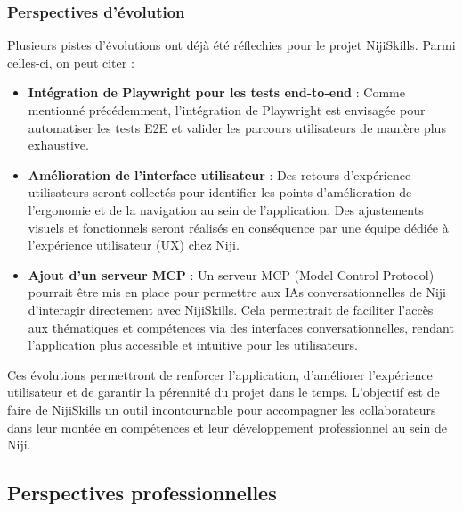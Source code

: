 \documentclass[12pt]{article}
\begin{document}
\subsubsection{Perspectives d’évolution}
Plusieurs pistes d'évolutions ont déjà été réflechies pour le projet NijiSkills. Parmi celles-ci, on peut citer :
\begin{itemize}
  \item \textbf{Intégration de Playwright pour les tests end-to-end} : Comme mentionné précédemment, l’intégration de Playwright est envisagée pour automatiser les tests E2E et valider les parcours utilisateurs de manière plus exhaustive.
  \item \textbf{Amélioration de l’interface utilisateur} : Des retours d’expérience utilisateurs seront collectés pour identifier les points d’amélioration de l’ergonomie et de la navigation au sein de l’application. Des ajustements visuels et fonctionnels seront réalisés en conséquence par une équipe dédiée à l’expérience utilisateur (UX) chez Niji.
  \item \textbf{Ajout d'un serveur MCP} : Un serveur MCP (Model Control Protocol) pourrait être mis en place pour permettre aux IAs conversationnelles de Niji d'interagir directement avec NijiSkills. Cela permettrait de faciliter l'accès aux thématiques et compétences via des interfaces conversationnelles, rendant l'application plus accessible et intuitive pour les utilisateurs.
\end{itemize}
\noindent
\newline
Ces évolutions permettront de renforcer l’application, d’améliorer l’expérience utilisateur et de garantir la pérennité du projet dans le temps. L’objectif est de faire de NijiSkills un outil incontournable pour accompagner les collaborateurs dans leur montée en compétences et leur développement professionnel au sein de Niji.
\subsection{Perspectives professionnelles}
\end{document}
